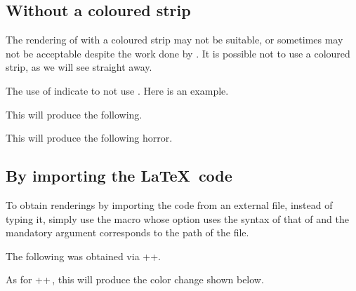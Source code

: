 



\subsection{Without a coloured strip}

The rendering of  with a coloured strip may not be suitable, or sometimes may not be acceptable despite the work done by .
It is possible not to use a coloured strip, as we will see straight away.


\begin{tdocexa}
    The use of  indicate to not use .
    Here is an example.



    This will produce the following.

    \medskip

    

\end{tdocexa}




\begin{tdocexa}
    \leavevmode



    This will produce the following horror.

    \medskip

    

\end{tdocexa}


\subsection{By importing the \LaTeX\ code}

To obtain renderings by importing the code from an external file, instead of typing it, simply use the  macro whose option uses the syntax of that of  and the mandatory argument corresponds to the path of the file.


\begin{tdocexa}
    The following was obtained via \tdocinlatex++.

    \medskip



    \medskip

    As for \tdocinlatex++\,, this will produce the color change shown below.

    \medskip


\end{tdocexa}


